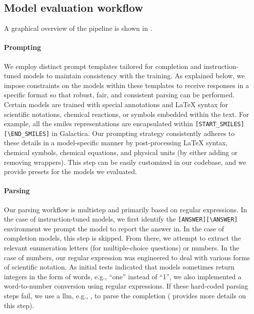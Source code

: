 \documentclass[11pt, oneside]{article}
\begin{document}
\begin{refsegment}
\subsection{Model evaluation workflow}
A graphical overview of the pipeline is shown in .

\paragraph{Prompting}

We employ distinct prompt templates tailored for completion and instruction-tuned models to maintain consistency with the training.
As explained below, we impose constraints on the models within these templates to receive responses in a specific format so that robust, fair, and consistent parsing can be performed.
Certain models are trained with special annotations and \LaTeX\xspace syntax for scientific notations, chemical reactions, or symbols embedded within the text.
For example, all the \gls{smiles} representations are encapsulated within \texttt{[START\_SMILES][\textbackslash END\_SMILES]} in Galactica\autocite{taylor2022galactica}.
Our prompting strategy consistently adheres to these details in a model-specific manner by post-processing \LaTeX\xspace syntax, chemical symbols, chemical equations, and physical units (by either adding or removing wrappers).
This step can be easily customized in our codebase, and we provide presets for the models we evaluated.


\paragraph{Parsing}
Our parsing workflow is multistep and primarily based on regular expressions.
In the case of instruction-tuned models, we first identify the \texttt{[ANSWER]}\texttt{[\textbackslash ANSWER]} environment we prompt the model to report the answer in.
In the case of completion models, this step is skipped. From there, we attempt to extract the relevant enumeration letters (for multiple-choice questions) or numbers.
In the case of numbers, our regular expression was engineered to deal with various forms of scientific notation.
As initial tests indicated that models sometimes return integers in the form of words, e.g., \enquote{one} instead of \enquote{1}, we also implemented a word-to-number conversion using regular expressions.
If these hard-coded parsing steps fail, we use a \gls{llm}, e.g., \ClaudeThreeFiveSonnet, to parse the completion ( provides more details on this step).



\end{refsegment}
\end{document}
